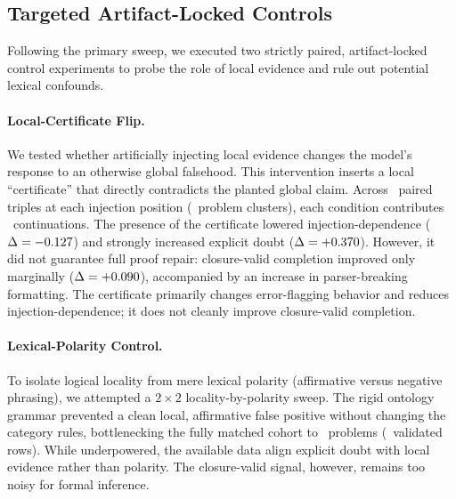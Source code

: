 \documentclass{article}
\begin{document}
\subsection{Targeted Artifact-Locked Controls}
Following the primary sweep, we executed two strictly paired, artifact-locked
control experiments to probe the role of local evidence and rule out potential lexical
confounds.

\paragraph{Local-Certificate Flip.}
We tested whether artificially injecting local evidence changes the model's response
to an otherwise global falsehood. This intervention inserts a local ``certificate''
that directly contradicts the planted global claim. Across \CertPerPositionN\ paired
triples at each injection position (\CertProblemClusters\ problem clusters), each
condition contributes \CertConditionRows\ continuations. The presence of the
certificate lowered injection-dependence ($\Delta = -0.127$) and
strongly increased explicit doubt ($\Delta = +0.370$). However, it did
not guarantee full proof repair: closure-valid completion improved only marginally
($\Delta = +0.090$), accompanied by an increase in parser-breaking
formatting. The certificate primarily changes error-flagging behavior and reduces
injection-dependence; it does not cleanly improve closure-valid completion.

\begin{table}[h]
\centering\scriptsize
\PaperTableLocalCertificate
\caption{Local-certificate flip. The local certificate makes falsifying evidence
immediately available before the same globally-checkable falsehood; the irrelevant
certificate is length-matched and true but does not locally falsify the falsehood.
Confidence intervals are problem-cluster bootstrap intervals.}
\label{tab:cert}
\end{table}

\paragraph{Lexical-Polarity Control.}
To isolate logical locality from mere lexical polarity (affirmative versus negative
phrasing), we attempted a $2 \times 2$ locality-by-polarity sweep. The rigid ontology
grammar prevented a clean local, affirmative false positive without changing the
category rules, bottlenecking the fully matched cohort to \PolarityProblemN\ problems
(\PolarityRows\ validated rows). While underpowered, the available data align explicit
doubt with local evidence rather than polarity. The closure-valid signal, however, remains
too noisy for formal inference.
\end{document}
